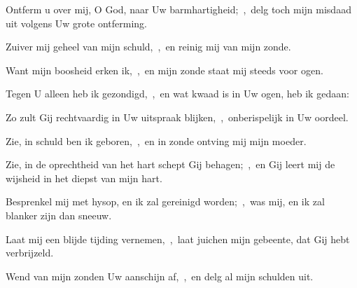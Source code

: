 \documentclass[12pt,twoside,a5paper]{article}
\begin{document}


\begin{halfparskip}
  Ontferm u over mij, O God, naar Uw barmhartigheid;~\sep\ delg toch mijn misdaad uit volgens Uw grote ontferming.


  Zuiver mij geheel van mijn schuld,~\sep\ en reinig mij van mijn zonde.

  Want mijn boosheid erken ik,~\sep\ en mijn zonde staat mij steeds voor ogen.

  Tegen U alleen heb ik gezondigd,~\sep\ en wat kwaad is in Uw ogen, heb ik gedaan:

  Zo zult Gij rechtvaardig in Uw uitspraak blijken,~\sep\ onberispelijk in Uw oordeel.

  Zie, in schuld ben ik geboren,~\sep\ en in zonde ontving mij mijn moeder.

  Zie, in de oprechtheid van het hart schept Gij behagen;~\sep\ en Gij leert mij de wijsheid in het diepst van mijn hart.
\end{halfparskip}


\begin{halfparskip}
  Besprenkel mij met hysop, en ik zal gereinigd worden;~\sep\ was mij, en ik zal blanker zijn dan sneeuw.

  Laat mij een blijde tijding vernemen,~\sep\ laat juichen mijn gebeente, dat Gij hebt verbrijzeld.

  Wend van mijn zonden Uw aanschijn af,~\sep\ en delg al mijn schulden uit.
\end{halfparskip}

\end{document}
